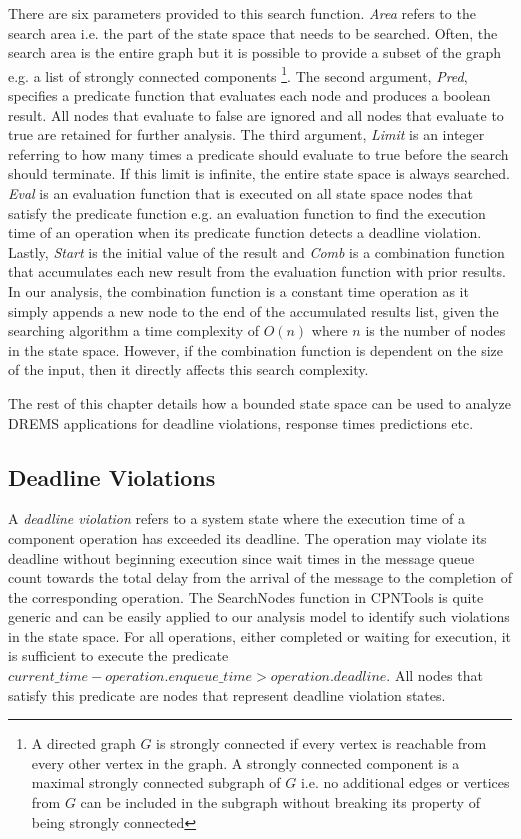 There are six parameters provided to this search function. \emph{Area} refers to the search area i.e. the part of the state space that needs to be searched. Often, the search area is the entire graph but it is possible to provide a subset of the graph e.g. a list of strongly connected components \footnote{A directed graph $G$ is strongly connected if every vertex is reachable from every other vertex in the graph. A strongly connected component is a maximal strongly connected subgraph of $G$ i.e. no additional edges or vertices from $G$ can be included in the subgraph without breaking its property of being strongly connected}. The second argument, \emph{Pred}, specifies a predicate function that evaluates each node and produces a boolean result. All nodes that evaluate to false are ignored and all nodes that evaluate to true are retained for further analysis. The third argument, \emph{Limit} is an integer referring to how many times a predicate should evaluate to true before the search should terminate. If this limit is infinite, the entire state space is always searched. \emph{Eval} is an evaluation function that is executed on all state space nodes that satisfy the predicate function e.g. an evaluation function to find the execution time of an operation when its predicate function detects a deadline violation. Lastly, \emph{Start} is the initial value of the result and \emph{Comb} is a combination function that accumulates each new result from the evaluation function with prior results. In our analysis, the combination function is a constant time operation as it simply appends a new node to the end of the accumulated results list, given the searching algorithm a time complexity of $O(n)$ where $n$ is the number of nodes in the state space. However, if the combination function is dependent on the size of the input, then it directly affects this search complexity. 

The rest of this chapter details how a bounded state space can be used to analyze DREMS applications for deadline violations, response times predictions etc. 

\subsection{Deadline Violations}

A \emph{deadline violation} refers to a system state where the execution time of a component operation has exceeded its deadline. The operation may violate its deadline without beginning execution since wait times in the message queue count towards the total delay from the arrival of the message to the completion of the corresponding operation. The SearchNodes function in CPNTools is quite generic and can be easily applied to our analysis model to identify such violations in the state space. For all operations, either completed or waiting for execution, it is sufficient to execute the predicate $current\_time - operation.enqueue\_time > operation.deadline$. All nodes that satisfy this predicate are nodes that represent deadline violation states. 

